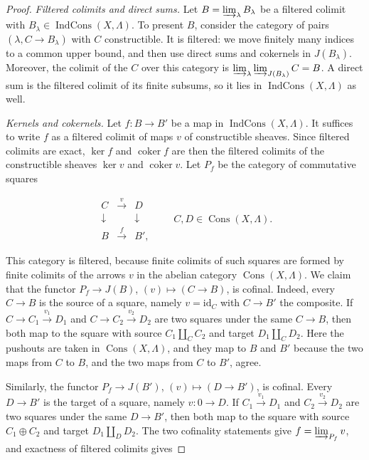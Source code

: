 \documentclass[11pt]{article}
\providecommand{\Cons}{}\renewcommand{\Cons}{\operatorname{Cons}}
\providecommand{\IndCons}{}\renewcommand{\IndCons}{\operatorname{IndCons}}
\providecommand{\coker}{}\renewcommand{\coker}{\operatorname{coker}}
\begin{document}
\begin{proof}[{Proof}]
\emph{Filtered colimits and direct sums.} Let \(B=\varinjlim_\lambda B_\lambda\) be a filtered colimit with \(B_\lambda\in\IndCons(X,\Lambda)\). To present \(B\), consider the category of pairs \((\lambda,C\to B_\lambda)\) with \(C\) constructible. It is filtered: we move finitely many indices to a common upper bound, and then use direct sums and cokernels in \(J(B_\lambda)\). Moreover, the colimit of the \(C\) over this category is \(\varinjlim_\lambda\varinjlim_{J(B_\lambda)}C=B\). A direct sum is the filtered colimit of its finite subsums, so it lies in \(\IndCons(X,\Lambda)\) as well.

\emph{Kernels and cokernels.} Let \(f:B\to B'\) be a map in \(\IndCons(X,\Lambda)\). It suffices to write \(f\) as a filtered colimit of maps \(v\) of constructible sheaves. Since filtered colimits are exact, \(\ker f\) and \(\coker f\) are then the filtered colimits of the constructible sheaves \(\ker v\) and \(\coker v\). Let \(P_f\) be the category of commutative squares

\[
\begin{matrix} C&\xrightarrow{v}&D\\
\downarrow&&\downarrow\\ B&\xrightarrow{f}&B',\end{matrix}
\qquad C,D\in\Cons(X,\Lambda).
\]

This category is filtered, because finite colimits of such squares are formed by finite colimits of the arrows \(v\) in the abelian category \(\Cons(X,\Lambda)\). We claim that the functor \(P_f\to J(B)\), \((v)\mapsto(C\to B)\), is cofinal. Indeed, every \(C\to B\) is the source of a square, namely \(v=\mathrm{id}_C\) with \(C\to B'\) the composite. If \(C\to C_1\xrightarrow{v_1}D_1\) and \(C\to C_2\xrightarrow{v_2}D_2\) are two squares under the same \(C\to B\), then both map to the square with source \(C_1\amalg_CC_2\) and target \(D_1\amalg_CD_2\). Here the pushouts are taken in \(\Cons(X,\Lambda)\), and they map to \(B\) and \(B'\) because the two maps from \(C\) to \(B\), and the two maps from \(C\) to \(B'\), agree.

Similarly, the functor \(P_f\to J(B')\), \((v)\mapsto(D\to B')\), is cofinal. Every \(D\to B'\) is the target of a square, namely \(v:0\to D\). If \(C_1\xrightarrow{v_1}D_1\) and \(C_2\xrightarrow{v_2}D_2\) are two squares under the same \(D\to B'\), then both map to the square with source \(C_1\oplus C_2\) and target \(D_1\amalg_DD_2\). The two cofinality statements give \(f=\varinjlim_{P_f}v\), and exactness of filtered colimits gives


\end{proof}
\end{document}
